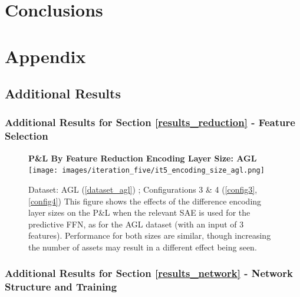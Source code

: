 \documentclass[a4paper,11pt,oneside]{article}
\theoremstyle{plain}
\theoremstyle{definition}
\begin{document}
\newpage
\section{Conclusions}\label{Conclusion}


\newpage
\section{Appendix}\label{Appendix}

\subsection{Additional Results}

\subsubsection{Additional Results for Section \ref{results_reduction} - Feature Selection }

\begin{figure}[H]
	\centering 
	\textbf{P\&L By Feature Reduction Encoding Layer Size: AGL}
	\texttt{[image: images/iteration\_five/it5\_encoding\_size\_agl.png]} 
	\caption{Dataset: AGL (\ref{dataset_agl}) ; Configurations 3 \& 4 (\ref{config3}, \ref{config4}) 
		\newline This figure shows the effects of the difference encoding layer sizes on the P\&L when the relevant SAE is used for the predictive FFN, as for the AGL dataset (with an input of 3 features). Performance for both sizes are similar, though increasing the number of assets may result in a different effect being seen.}
	\label{figure-results_encoding_agl}
\end{figure}

\subsubsection{Additional Results for Section \ref{results_network} - Network Structure and Training }\label{results_network_appendix}
\end{document}
